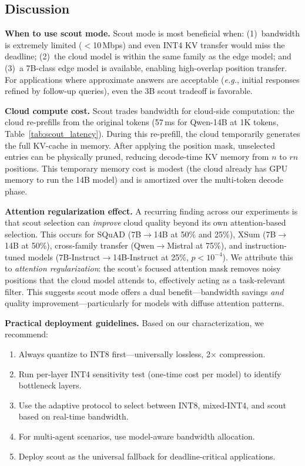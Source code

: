 \documentclass[journal]{IEEEtran}
\newcommand{\eg}{\textit{e.g.}\xspace}
\begin{document}
\subsection{Discussion}

\textbf{When to use scout mode.}
Scout mode is most beneficial when: (1)~bandwidth is extremely limited ($<$10\,Mbps) and even INT4 KV transfer would miss the deadline; (2)~the cloud model is within the same family as the edge model; and (3)~a 7B-class edge model is available, enabling high-overlap position transfer.
For applications where approximate answers are acceptable (\eg, initial responses refined by follow-up queries), even the 3B scout tradeoff is favorable.

\textbf{Cloud compute cost.}
Scout trades bandwidth for cloud-side computation: the cloud re-prefills from the original tokens (57\,ms for Qwen-14B at 1K tokens, Table~\ref{tab:scout_latency}).
During this re-prefill, the cloud temporarily generates the full KV-cache in memory.
After applying the position mask, unselected entries can be physically pruned, reducing decode-time KV memory from $n$ to $rn$ positions.
This temporary memory cost is modest (the cloud already has GPU memory to run the 14B model) and is amortized over the multi-token decode phase.

\textbf{Attention regularization effect.}
A recurring finding across our experiments is that scout selection can \emph{improve} cloud quality beyond its own attention-based selection.
This occurs for SQuAD (7B$\to$14B at 50\% and 25\%), XSum (7B$\to$14B at 50\%), cross-family transfer (Qwen$\to$Mistral at 75\%), and instruction-tuned models (7B-Instruct$\to$14B-Instruct at 25\%, $p < 10^{-4}$).
We attribute this to \emph{attention regularization}: the scout's focused attention mask removes noisy positions that the cloud model attends to, effectively acting as a task-relevant filter.
This suggests scout mode offers a dual benefit---bandwidth savings \emph{and} quality improvement---particularly for models with diffuse attention patterns.

\textbf{Practical deployment guidelines.}
Based on our characterization, we recommend:
\begin{enumerate}
    \item Always quantize to INT8 first---universally lossless, 2$\times$ compression.
    \item Run per-layer INT4 sensitivity test (one-time cost per model) to identify bottleneck layers.
    \item Use the adaptive protocol to select between INT8, mixed-INT4, and scout based on real-time bandwidth.
    \item For multi-agent scenarios, use model-aware bandwidth allocation.
    \item Deploy scout as the universal fallback for deadline-critical applications.
\end{enumerate}
\end{document}
